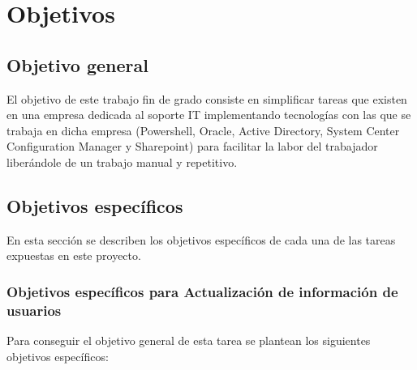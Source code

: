 \documentclass[a4paper, 12pt]{book}
\begin{document}

\cleardoublepage %
\chapter{Objetivos} %
\label{chap:objetivos} %

\section{Objetivo general} %
\label{sec:objetivo-general} %

El objetivo de este trabajo fin de grado consiste en simplificar tareas que existen en una empresa dedicada al soporte IT implementando tecnologías con las que se trabaja en dicha empresa (Powershell, Oracle, Active Directory, System Center Configuration Manager y Sharepoint) para facilitar la labor del trabajador liberándole de un trabajo manual y repetitivo.


\section{Objetivos específicos}
\label{sec:objetivos-especificos}

En esta sección se describen los objetivos específicos de cada una de las tareas expuestas en este proyecto.

\subsection{Objetivos específicos para Actualización de información de usuarios}
\label{Objetivos específicos para Actualización de información de usuarios}

Para conseguir el objetivo general de esta tarea se plantean los siguientes objetivos específicos:
\end{document}
